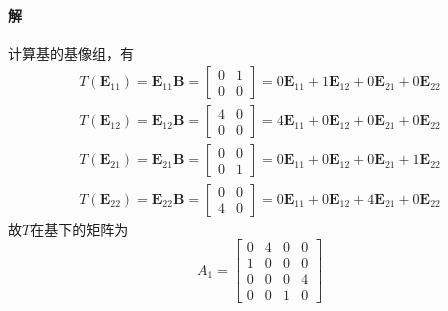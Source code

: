 \documentclass[12pt, a4paper, oneside, fontset=none]{ctexart}
\begin{document}
\paragraph*{解} 计算基的基像组，有
\begin{gather*}
    T(\bm{E}_{11}) = \bm{E}_{11}\bm{B} = \begin{bmatrix}
        0 & 1 \\
        0 & 0
    \end{bmatrix} = 0\bm{E}_{11} + 1\bm{E}_{12} + 0\bm{E}_{21} + 0\bm{E}_{22} \\
    T(\bm{E}_{12}) = \bm{E}_{12}\bm{B} = \begin{bmatrix}
        4 & 0 \\
        0 & 0
    \end{bmatrix} = 4\bm{E}_{11} + 0\bm{E}_{12} + 0\bm{E}_{21} + 0\bm{E}_{22} \\
    T(\bm{E}_{21}) = \bm{E}_{21}\bm{B} = \begin{bmatrix}
        0 & 0 \\
        0 & 1
    \end{bmatrix} = 0\bm{E}_{11} + 0\bm{E}_{12} + 0\bm{E}_{21} + 1\bm{E}_{22} \\
    T(\bm{E}_{22}) = \bm{E}_{22}\bm{B} = \begin{bmatrix}
        0 & 0 \\
        4 & 0
    \end{bmatrix} = 0\bm{E}_{11} + 0\bm{E}_{12} + 4\bm{E}_{21} + 0\bm{E}_{22}
\end{gather*}
故$T$在基下的矩阵为
\[
    A_1 = \begin{bmatrix}
        0 & 4 & 0 & 0 \\
        1 & 0 & 0 & 0 \\
        0 & 0 & 0 & 4 \\
        0 & 0 & 1 & 0
    \end{bmatrix}
\]
\end{document}

